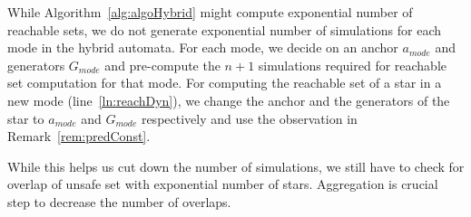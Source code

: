 \begin{remark}
\label{rem:hybridAlgo}
While Algorithm~\ref{alg:algoHybrid} might compute exponential number of reachable sets, we do not generate exponential number of simulations for each mode in the hybrid automata. For each mode, we decide on an anchor $a_{mode}$ and generators $G_{mode}$ and pre-compute the $n+1$ simulations required for reachable set computation for that mode. For computing the reachable set of a star in a new mode (line~\ref{ln:reachDyn}), we change the anchor and the generators of the star to $a_{mode}$ and $G_{mode}$ respectively and use the observation in Remark~\ref{rem:predConst}. 

While this helps us cut down the number of simulations, we still have to check for overlap of unsafe set with exponential number of stars. Aggregation is crucial step to decrease the number of overlaps.
\end{remark}


%
%
